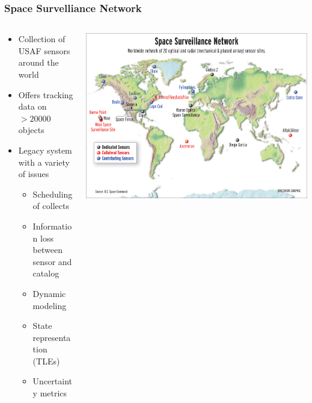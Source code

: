 \begin{frame}[t]\frametitle{Space Survelliance Network}
    \begin{columns}
    \begin{column}{0.5\textwidth}
        \begin{itemize}
            \item<1-> Collection of USAF sensors around the world
            \item<2-> Offers tracking data on \( > 20000  \) objects
            \item<3-> Legacy system with a variety of issues
            \begin{itemize}
                \item Scheduling of collects
                \item Information loss between sensor and catalog
                \item Dynamic modeling
                \item State representation (TLEs)
                \item Uncertainty metrics
            \end{itemize}
        \end{itemize}
    \end{column}
    \begin{column}{0.5\textwidth}
        \begin{center}
            \includegraphics[width=\textwidth,height=0.6\textheight,keepaspectratio]{figures/airforce/ssn.jpg}
        \end{center}
    \end{column}
    \end{columns}
\end{frame}

